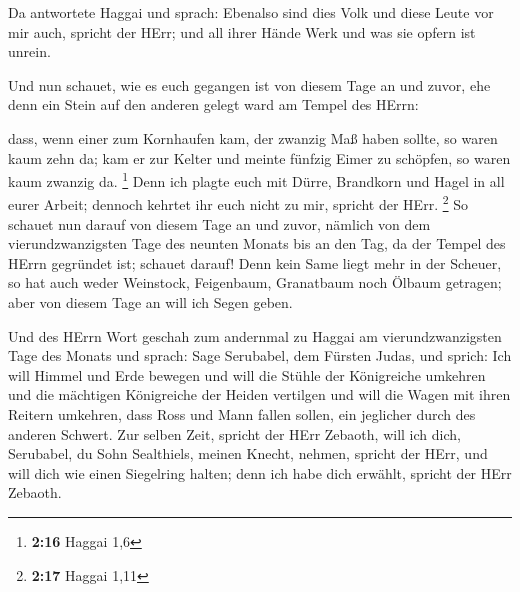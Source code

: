 Da antwortete Haggai und sprach: Ebenalso sind dies Volk
und diese Leute vor mir auch, spricht der HErr; und all ihrer Hände Werk
und was sie opfern ist unrein.

 Und nun schauet, wie es euch gegangen ist von diesem Tage
an und zuvor, ehe denn ein Stein auf den anderen gelegt ward am Tempel
des HErrn:

 dass, wenn einer zum Kornhaufen kam, der zwanzig Maß haben
sollte, so waren kaum zehn da; kam er zur Kelter und meinte fünfzig
Eimer zu schöpfen, so waren kaum zwanzig da. \footnote{\textbf{2:16}
  Haggai 1,6}  Denn ich plagte euch mit Dürre, Brandkorn
und Hagel in all eurer Arbeit; dennoch kehrtet ihr euch nicht zu mir,
spricht der HErr. \footnote{\textbf{2:17} Haggai 1,11}  So
schauet nun darauf von diesem Tage an und zuvor, nämlich von dem
vierundzwanzigsten Tage des neunten Monats bis an den Tag, da der Tempel
des HErrn gegründet ist; schauet darauf!  Denn kein Same
liegt mehr in der Scheuer, so hat auch weder Weinstock, Feigenbaum,
Granatbaum noch Ölbaum getragen; aber von diesem Tage an will ich Segen
geben.

 Und des HErrn Wort geschah zum andernmal zu Haggai am
vierundzwanzigsten Tage des Monats und sprach:  Sage
Serubabel, dem Fürsten Judas, und sprich: Ich will Himmel und Erde
bewegen  und will die Stühle der Königreiche umkehren und
die mächtigen Königreiche der Heiden vertilgen und will die Wagen mit
ihren Reitern umkehren, dass Ross und Mann fallen sollen, ein jeglicher
durch des anderen Schwert.  Zur selben Zeit, spricht der
HErr Zebaoth, will ich dich, Serubabel, du Sohn Sealthiels, meinen
Knecht, nehmen, spricht der HErr, und will dich wie einen Siegelring
halten; denn ich habe dich erwählt, spricht der HErr Zebaoth.
